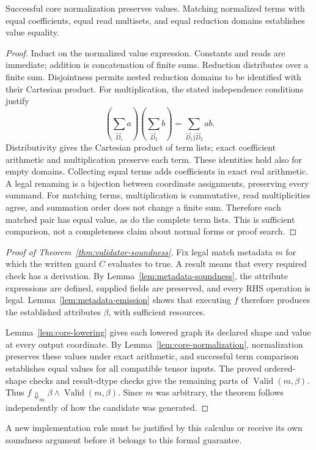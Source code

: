 \begin{lemma}
\label{lem:core-normalization}
Successful core normalization preserves values. Matching normalized terms
with equal coefficients, equal read multisets, and equal reduction domains
establishes value equality.
\end{lemma}
\begin{proof}
Induct on the normalized value expression. Constants and reads are immediate;
addition is concatenation of finite sums. Reduction distributes over a
finite sum. Disjointness permits nested reduction domains to be identified
with their Cartesian product. For multiplication, the stated independence
conditions justify
\begin{equation}
 \left(\sum_{\vec D_1}a\right)\left(\sum_{\vec D_2}b\right)
 =\sum_{\vec D_1\Vert \vec D_2}ab.
\end{equation}
Distributivity gives the Cartesian product of term lists; exact coefficient
arithmetic and multiplication preserve each term. These identities hold
also for empty domains. Collecting equal terms adds coefficients in exact
real arithmetic. A legal renaming is a bijection between coordinate
assignments, preserving every summand. For matching terms, multiplication
is commutative, read multiplicities agree, and summation order does not
change a finite sum. Therefore each matched pair has equal value, as do
the complete term lists. This is sufficient comparison, not a completeness
claim about normal forms or proof search.
\end{proof}

\begin{proof}[Proof of Theorem~\ref{thm:validator-soundness}]
Fix legal match metadata $m$ for which the written guard $C$ evaluates to
true. A  result means that every required check has a
derivation. By Lemma~\ref{lem:metadata-soundness}, the attribute expressions
are defined, supplied fields are preserved, and every RHS operation is
legal. Lemma~\ref{lem:metadata-emission} shows that executing $f$ therefore
produces the established attributes $\beta$, with sufficient resources.

Lemma~\ref{lem:core-lowering} gives each lowered graph its declared shape
and value at every output coordinate. By
Lemma~\ref{lem:core-normalization}, normalization preserves these values
under exact arithmetic, and successful term comparison establishes equal
values for all compatible tensor inputs. The proved ordered-shape checks
and result-dtype checks give the remaining parts of
$\operatorname{Valid}(m,\beta)$. Thus
$f\Downarrow_m\beta\land\operatorname{Valid}(m,\beta)$.
Since $m$ was arbitrary, the theorem follows independently of how the
candidate was generated.
\end{proof}
A new implementation rule must be justified by this calculus or receive
its own soundness argument before it belongs to this formal guarantee.


